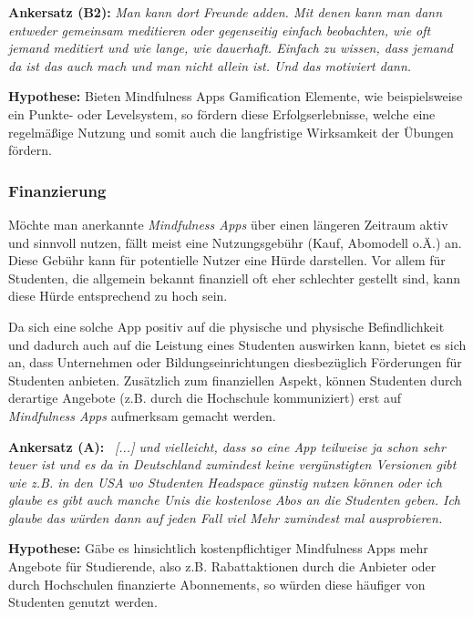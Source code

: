 \documentclass[10pt]{article}
\begin{document}
\medskip
\textbf{Ankersatz (B2):}
\newline
\grqq\textit{Man kann dort Freunde adden. Mit denen kann man dann entweder gemeinsam meditieren oder gegenseitig einfach beobachten, wie oft jemand meditiert und wie lange, wie dauerhaft. Einfach zu wissen, dass jemand da ist das auch mach und man nicht allein ist. Und das motiviert dann.}\grqq\
\medskip

\medskip
\textbf{Hypothese: }
\newline
Bieten Mindfulness Apps Gamification Elemente, wie beispielsweise ein Punkte- oder Levelsystem, so fördern diese Erfolgserlebnisse, welche eine regelmäßige Nutzung und somit auch die langfristige Wirksamkeit der Übungen fördern.

\subsubsection{Finanzierung}
Möchte man anerkannte \textit{Mindfulness Apps} über einen längeren Zeitraum aktiv und sinnvoll nutzen, fällt meist eine Nutzungsgebühr (Kauf, Abomodell o.Ä.) an. Diese Gebühr kann für potentielle Nutzer eine Hürde darstellen. Vor allem für Studenten, die allgemein bekannt finanziell oft eher schlechter gestellt sind,  kann diese Hürde entsprechend zu hoch sein.

Da sich eine solche App positiv auf die physische und physische  Befindlichkeit und dadurch auch auf die Leistung eines Studenten auswirken kann, bietet es sich an, dass Unternehmen oder  Bildungseinrichtungen diesbezüglich Förderungen für Studenten anbieten.
Zusätzlich zum finanziellen Aspekt, können Studenten durch derartige Angebote (z.B. durch die Hochschule kommuniziert) erst auf \textit{Mindfulness Apps} aufmerksam gemacht werden.

\medskip
\textbf{Ankersatz (A):}
\newline
\grqq\ \textit{[...] und vielleicht, dass so eine App teilweise ja schon sehr teuer ist und es da in Deutschland zumindest keine vergünstigten Versionen gibt wie z.B. in den USA wo Studenten Headspace günstig nutzen können oder ich glaube es gibt auch manche Unis die kostenlose Abos an die Studenten geben. Ich glaube das würden dann auf jeden Fall viel Mehr zumindest mal ausprobieren. }\grqq\
\medskip

\medskip
\textbf{Hypothese: }
\newline
Gäbe es hinsichtlich kostenpflichtiger Mindfulness Apps mehr Angebote für Studierende, also z.B. Rabattaktionen durch die Anbieter oder durch Hochschulen finanzierte Abonnements, so würden diese häufiger von Studenten genutzt werden.
\end{document}
